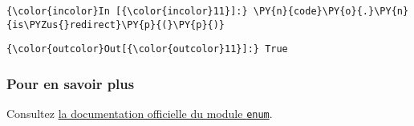     \begin{Verbatim}[commandchars=\\\{\}]
{\color{incolor}In [{\color{incolor}11}]:} \PY{n}{code}\PY{o}{.}\PY{n}{is\PYZus{}redirect}\PY{p}{(}\PY{p}{)}
\end{Verbatim}


\begin{Verbatim}[commandchars=\\\{\}]
{\color{outcolor}Out[{\color{outcolor}11}]:} True
\end{Verbatim}
            
    \hypertarget{pour-en-savoir-plus}{%
\subsubsection{Pour en savoir plus}\label{pour-en-savoir-plus}}

Consultez \href{https://docs.python.org/3/library/enum.html}{la
documentation officielle du module \texttt{enum}}.


    
    
    
